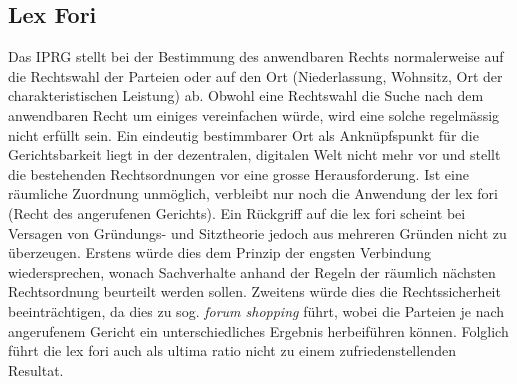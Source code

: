 \documentclass[a4paper,12pt]{report}
\begin{document}
	\subsection{Lex Fori}
	\startsubsection
    Das IPRG stellt bei der Bestimmung des anwendbaren Rechts normalerweise auf die Rechtswahl der Parteien oder auf den Ort (Niederlassung, Wohnsitz, Ort der charakteristischen Leistung) ab. Obwohl eine Rechtswahl die Suche nach dem anwendbaren Recht um einiges vereinfachen würde, wird eine solche regelmässig nicht erfüllt sein. Ein eindeutig bestimmbarer Ort als Anknüpfspunkt für die Gerichtsbarkeit liegt in der dezentralen, digitalen Welt nicht mehr vor und stellt die bestehenden Rechtsordnungen vor eine grosse Herausforderung. Ist eine räumliche Zuordnung unmöglich, verbleibt nur noch die Anwendung der lex fori (Recht des angerufenen Gerichts). Ein Rückgriff auf die lex fori scheint bei Versagen von Gründungs- und Sitztheorie jedoch aus mehreren Gründen nicht zu überzeugen. Erstens würde dies dem Prinzip der engsten Verbindung wiedersprechen, wonach Sachverhalte anhand der Regeln der räumlich nächsten Rechtsordnung beurteilt werden sollen. Zweitens würde dies die Rechtssicherheit beeinträchtigen, da dies zu sog. \textit{forum shopping} führt, wobei die Parteien je nach angerufenem Gericht ein unterschiedliches Ergebnis herbeiführen können. Folglich führt die lex fori auch als ultima ratio nicht zu einem zufriedenstellenden Resultat.
    \closesection
    
\end{document}
